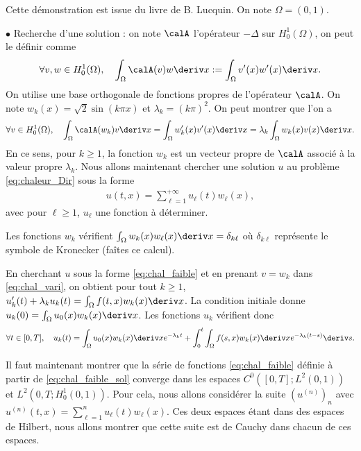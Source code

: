 \documentclass[12pt,a4paper,twoside]{article}
\begin{document}
Cette d\'emonstration est issue du livre de B. Lucquin.
On note $\Omega = (0,1)$.

$\bullet$ Recherche d'une solution :
on note $\calA$ l'op\'erateur $-\Delta$ sur $H^1_0(\Omega)$,
on peut le d\'efinir comme
\begin{align*}
  \forall v,w \in H_0^1(\Omega) , \quad  \int_{\Omega} \calA(v) w \deriv x
  := \int_{\Omega} v'(x) w'(x) \deriv x .
\end{align*}
On utilise une base orthogonale de fonctions propres de l'op\'erateur $\calA$.
On note $w_k(x) = \sqrt{2} \sin(k \pi x)$ et $\lambda_k = (k\pi)^2$.
On peut montrer que l'on a
\begin{align*}
  \forall v \in H_0^1(\Omega) , \quad
  \int_{\Omega} \calA(w_k) v \deriv x 
  = \int_{\Omega} w_k'(x) v'(x) \deriv x = \lambda_k \int_{\Omega} w_k(x) v(x) \deriv x .
\end{align*}
En ce sens, pour $k \geq 1$, la fonction $w_k$ est un vecteur propre de $\calA$
associ\'e \`a la valeur propre $\lambda_k$.
Nous allons maintenant chercher une solution $u$ au probl\`eme \eqref{eq:chaleur_Dir}
sous la forme
\begin{align}
  \label{eq:chal_faible}
  u(t,x) = \sum_{\ell = 1}^{+\infty} u_{\ell} (t) w_{\ell} (x) ,
\end{align}
avec pour $\ell \geq 1$, $u_{\ell}$ une fonction \`a d\'eterminer.

Les fonctions $w_k$ v\'erifient $\int_{\Omega} w_k (x) w_{\ell}(x) \deriv x = \delta_{k \ell}$
o\`u $\delta_{k\ell}$ repr\'esente le symbole de Kronecker (fa\^ites ce calcul).

En cherchant $u$ sous la forme \eqref{eq:chal_faible} et en prenant $v = w_k$
dans \eqref{eq:chal_vari}, on obtient
pour tout $k \geq 1$, $u_k'(t) + \lambda_k u_k(t) = \int_{\Omega} f(t,x) w_k(x) \deriv x$.
La condition initiale donne $u_k(0) = \int_{\Omega} u_0(x) w_k(x) \deriv x$.
Les fonctions $u_k$ v\'erifient donc 
\begin{align}
  \label{eq:chal_faible_sol}
  \forall t \in [0,T] , \quad u_k(t) = \int_{\Omega} u_0(x) w_k(x) \deriv x e^{- \lambda_k t}
  + \int_{0}^t \int_{\Omega} f(s,x) w_k(x) \deriv x e^{- \lambda_k (t-s)} \deriv s .
\end{align}

Il faut maintenant montrer que la s\'erie de fonctions \eqref{eq:chal_faible}
d\'efinie \`a partir de \eqref{eq:chal_faible_sol} converge
dans les espaces $C^0([0,T];L^2(0,1))$ et $L^2(0,T;H^1_0(0,1))$.
Pour cela, nous allons consid\'erer la suite 
$(u^{(n)})_n$ avec $u^{(n)}(t,x) = \sum_{\ell=1}^n u_{\ell}(t) w_{\ell}(x)$. 
Ces deux espaces \'etant dans des espaces de Hilbert,
nous allons montrer que cette suite est de Cauchy dans chacun de ces espaces.
\end{document}
